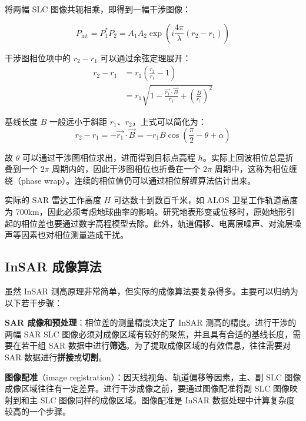 将两幅 SLC 图像共轭相乘，即得到一幅干涉图像：

\begin{equation}
    P_{\textrm{int}} = P_1^* P_2 =  A_1 A_2 \exp(i \frac{4\pi}{\lambda}(r_2 - r_1))
\end{equation}

干涉图相位项中的 $ r_2 - r_1 $ 可以通过余弦定理展开：
\begin{equation}
\begin{split}
    r_2 - r_1 &= r_1 (\frac{r_2}{r_1} - 1) \\
              &= r_1 \sqrt{1- \frac{\vec{r_1} \cdot \vec{B}}{r_1} + (\frac{B}{r_1})^2}
\end{split}
\end{equation}

基线长度 $B$ 一般远小于斜距 $r_1$、$r_2$，上式可以简化为：
\begin{equation}
    r_2 - r_1 = - \vec{r_1} \cdot \vec{B} = - r_1 B \cos(\frac{\pi}{2} - \theta + \alpha)
\end{equation}

故 $\theta$ 可以通过干涉图相位求出，进而得到目标点高程 $h$。实际上回波相位总是折叠到一个 $2\pi$ 周期内的，因此干涉图相位也折叠在一个 $2\pi$ 周期中，这称为相位缠绕（phase wrap）。连续的相位值仍可以通过相位解缠算法估计出来。

实际的 SAR 雷达工作高度 $H$ 可达数十到数百千米，如 ALOS 卫星工作轨道高度为 700km\cite{web:alos}，因此必须考虑地球曲率的影响。研究地表形变或位移时，原始地形引起的相位差也要通过数字高程模型去除。此外，轨道偏移、电离层噪声、对流层噪声等因素也对相位测量造成干扰。

\subsection{InSAR 成像算法}

虽然 InSAR 测高原理非常简单，但实际的成像算法要复杂得多。主要可以归纳为以下若干步骤\cite{sandwell2011gmtsar}：

\textbf{SAR 成像和预处理}：相位差的测量精度决定了 InSAR 测高的精度。进行干涉的两幅 SAR SLC 图像必须对成像区域有较好的聚焦，并且具有合适的基线长度，需要在若干组 SAR 数据中进行\textbf{筛选}。为了提取成像区域的有效信息，往往需要对 SAR 数据进行\textbf{拼接}或\textbf{切割}。

\textbf{图像配准}（image registration）：因天线视角、轨道偏移等因素，主、副 SLC 图像成像区域往往有一定差异。进行干涉成像之前，要通过图像配准将副 SLC 图像映射到和主 SLC 图像同样的成像区域。图像配准是 InSAR 数据处理中计算复杂度较高的一个步骤。

